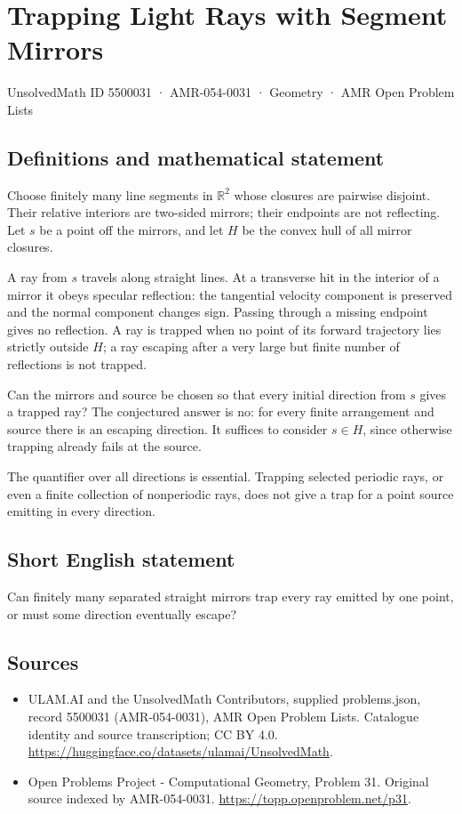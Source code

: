 \documentclass[11pt,a4paper]{article}
\begin{document}
\section*{Trapping Light Rays with Segment Mirrors}\label{5500031}
{\small UnsolvedMath ID 5500031 · AMR-054-0031 · Geometry · AMR Open Problem Lists}
\subsection{Definitions and mathematical statement}
Choose finitely many line segments in $\mathbb R^2$ whose closures are
pairwise disjoint. Their relative interiors are two-sided mirrors;
their endpoints are not reflecting. Let $s$ be a point off the mirrors,
and let $H$ be the convex hull of all mirror closures.

A ray from $s$ travels along straight lines. At a transverse hit in
the interior of a mirror it obeys specular reflection: the tangential
velocity component is preserved and the normal component changes sign.
Passing through a missing endpoint gives no reflection. A ray is
trapped when no point of its forward trajectory lies strictly outside
$H$; a ray escaping after a very large but finite number of reflections
is not trapped.

Can the mirrors and source be chosen so that every initial direction
from $s$ gives a trapped ray? The conjectured answer is no: for every
finite arrangement and source there is an escaping direction. It
suffices to consider $s\in H$, since otherwise trapping already fails
at the source.

The quantifier over all directions is essential. Trapping selected
periodic rays, or even a finite collection of nonperiodic rays, does
not give a trap for a point source emitting in every direction.
\subsection{Short English statement}
Can finitely many separated straight mirrors trap every ray emitted
by one point, or must some direction eventually escape?
\subsection{Sources}
\begin{itemize}
\item[S1] ULAM.AI and the UnsolvedMath Contributors, supplied problems.json, record 5500031 (AMR-054-0031), AMR Open Problem Lists. Catalogue identity and source transcription; CC BY 4.0.
\url{https://huggingface.co/datasets/ulamai/UnsolvedMath}.
\item[S2] Open Problems Project - Computational Geometry, Problem 31. Original source indexed by AMR-054-0031.
\url{https://topp.openproblem.net/p31}.
\end{itemize}
\end{document}
